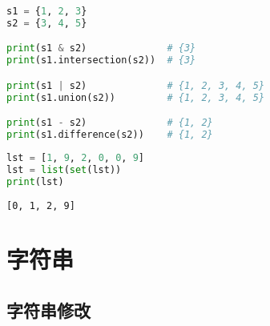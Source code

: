 \vspace{-0.5cm}

\begin{lstlisting}[language=Python]
s1 = {1, 2, 3}
s2 = {3, 4, 5}

print(s1 & s2)				# {3}
print(s1.intersection(s2))	# {3}

print(s1 | s2)				# {1, 2, 3, 4, 5}
print(s1.union(s2))			# {1, 2, 3, 4, 5}

print(s1 - s2)				# {1, 2}
print(s1.difference(s2))	# {1, 2}
\end{lstlisting}

\vspace{0.5cm}


\begin{lstlisting}[language=Python]
lst = [1, 9, 2, 0, 0, 9]
lst = list(set(lst))
print(lst)
\end{lstlisting}

\begin{tcolorbox}
	\begin{verbatim}
[0, 1, 2, 9]
	\end{verbatim}
\end{tcolorbox}

\newpage

\section{字符串}

\subsection{字符串修改}

\begin{table}[H]
	\centering
\end{table}

